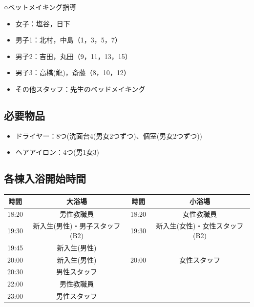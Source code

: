 ○ベットメイキング指導
\begin{itemize}
\item 女子：塩谷，日下
\item 男子1：北村，中島（1，3，5，7）
\item 男子2：吉田，丸田（9，11，13，15）
\item 男子3：高橋(龍)，斎藤（8，10，12）
\item その他スタッフ：先生のベッドメイキング
\end{itemize}
\subsection{必要物品}
\begin{itemize}
\item ドライヤー：8つ(洗面台4(男女2つずつ)、個室(男女2つずつ))
\item ヘアアイロン：4つ(男1女3)
\end{itemize}

\subsection{各棟入浴開始時間}
\label{sec:bath}
\begin{table}[H]
\begin{center}
\begin{tabular}{|c|c|c|c|}
\hline
 {時間}&{大浴場}&{時間}&{小浴場} \\ \hline
 18:20 & 男性教職員 & 18:20 & 女性教職員 \\ \hline
 19:30 & 新入生(男性)・男子スタッフ(B2) & 19:30 & 新入生(女性)・女性スタッフ(B2) \\ \hline
 19:45 & 新入生(男性) & & \\ \hline
 20:00 & 新入生(男性) & 20:00 & 女性スタッフ\\ \hline
 20:30 & 男性スタッフ & & \\ \hline
 22:00 & 男性教職員 & & \\ \hline
 23:00 & 男性スタッフ & & \\ \hline
\end{tabular}
\end{center}
\end{table}

